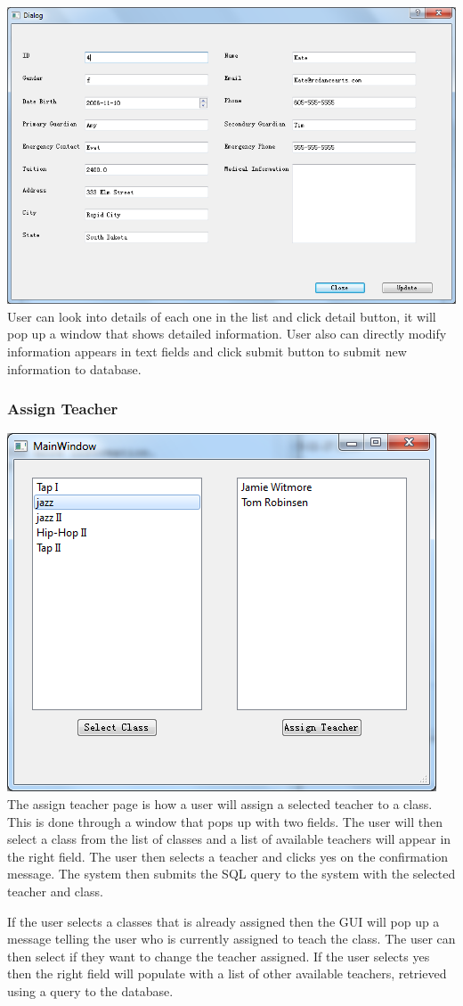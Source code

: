 \includegraphics[scale=0.5]{pics/detail.png}\\
User can look into details of each one in the list and click detail button, it will pop up a window that shows detailed information. User also can directly modify information appears in text fields and click submit button to submit new information to database.
\subsubsection{Assign Teacher}
\includegraphics[scale=0.5]{pics/assign_teacher.png}\\
The assign teacher page is how a user will assign a selected teacher to a class. This is done through a window that pops up with two fields. The user will then select a class from the list of classes and a list of available teachers will appear in the right field. The user then selects a teacher and clicks yes on the confirmation message. The system then submits the SQL query to the system with the selected teacher and class. 

If the user selects a classes that is already assigned then the GUI will pop up a message telling the user who is currently assigned to teach the class. The user can then select if they want to change the teacher assigned. If the user selects yes then the right field will populate with a list of other available teachers, retrieved using a query to the database.

